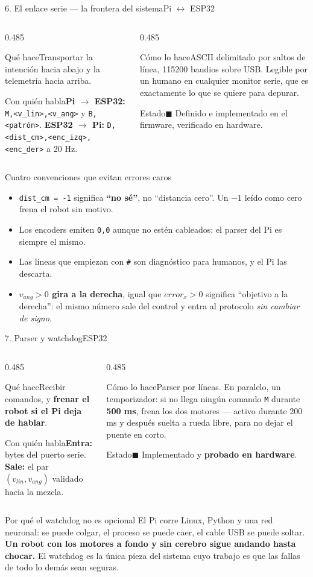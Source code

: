 \documentclass[aspectratio=169,10pt]{beamer}
\newcommand{\listo}{\textcolor{verde}{$\blacksquare$}}
\newcommand{\ficha}[4]{%
  {\footnotesize
  \begin{columns}[T,onlytextwidth]
    \begin{column}{0.485\textwidth}
      \begin{block}{Qué hace}#1\end{block}
      \begin{block}{Con quién habla}#3\end{block}
    \end{column}
    \begin{column}{0.485\textwidth}
      \begin{block}{Cómo lo hace}#2\end{block}
      \begin{block}{Estado}#4\end{block}
    \end{column}
  \end{columns}}}
\begin{document}
\begin{frame}{6. El enlace serie --- la frontera del sistema\hfill{\small\mdseries Pi $\leftrightarrow$ ESP32}}
  \ficha
  {Transportar la intención hacia abajo y la telemetría hacia arriba.}
  {ASCII delimitado por saltos de línea, 115200 baudios sobre USB. Legible por
   un humano en cualquier monitor serie, que es exactamente lo que se quiere
   para depurar.}
  {\textbf{Pi $\rightarrow$ ESP32:} \texttt{M,<v\_lin>,<v\_ang>} y
   \texttt{B,<patrón>}. \newline
   \textbf{ESP32 $\rightarrow$ Pi:} \texttt{D,<dist\_cm>,<enc\_izq>,<enc\_der>} a 20 Hz.}
  {\listo{} Definido e implementado en el firmware, verificado en hardware.}

  \vspace{0.2em}
  \begin{block}{Cuatro convenciones que evitan errores caros}
    \begin{itemize}\scriptsize
      \item \texttt{dist\_cm = -1} significa \textbf{``no sé''}, no ``distancia
            cero''. Un $-1$ leído como cero frena el robot sin motivo.
      \item Los encoders emiten \texttt{0,0} aunque no estén cableados: el parser
            del Pi es siempre el mismo.
      \item Las líneas que empiezan con \texttt{\#} son diagnóstico para humanos,
            y el Pi las descarta.
      \item \textbf{$v_{ang} > 0$ gira a la derecha}, igual que $error_x > 0$
            significa ``objetivo a la derecha'': el mismo número sale del control
            y entra al protocolo \emph{sin cambiar de signo}.
    \end{itemize}
  \end{block}
\end{frame}

\begin{frame}{7. Parser y watchdog\hfill{\small\mdseries ESP32}}
  \ficha
  {Recibir comandos, y \textbf{frenar el robot si el Pi deja de hablar}.}
  {Parser por líneas. En paralelo, un temporizador: si no llega ningún comando
   \texttt{M} durante \textbf{500 ms}, frena los dos motores --- activo durante
   200 ms y después suelta a rueda libre, para no dejar el puente en corto.}
  {\textbf{Entra:} bytes del puerto serie. \textbf{Sale:} el par
   $(v_{lin}, v_{ang})$ validado hacia la mezcla.}
  {\listo{} Implementado y \textbf{probado en hardware}.}

  \vspace{0.4em}
  \begin{alertblock}{Por qué el watchdog no es opcional}
    \small
    El Pi corre Linux, Python y una red neuronal: se puede colgar, el proceso se
    puede caer, el cable USB se puede soltar. \textbf{Un robot con los motores a
    fondo y sin cerebro sigue andando hasta chocar.} El watchdog es la única
    pieza del sistema cuyo trabajo es que las fallas de todo lo demás sean
    seguras.
  \end{alertblock}
\end{frame}
\end{document}
